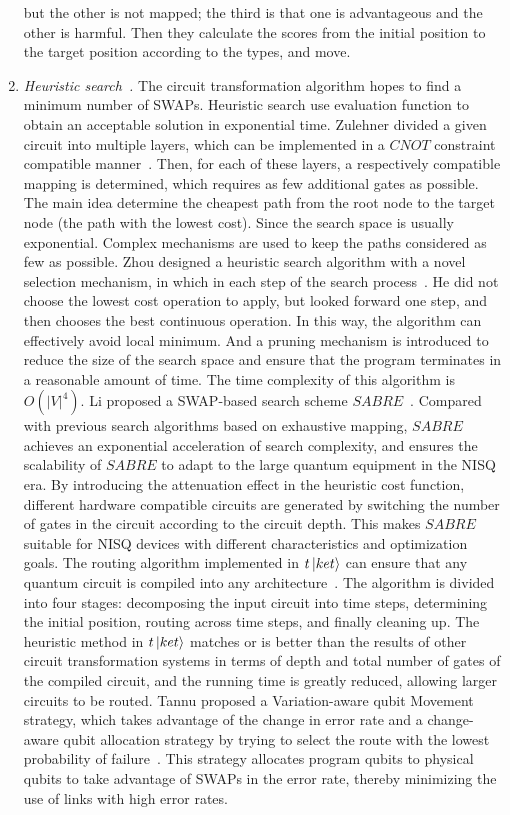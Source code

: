 \documentclass[runningheads]{llncs}
\begin{document}
\begin{enumerate}
   but the other is not mapped; 
   the third is that one is advantageous and the other is harmful.
   Then they calculate the scores from the initial position 
   to the target position according to the types, and move.
	\item \emph{Heuristic search~\cite{Zulehner2017,Cowtan2019,Li2018,Xiangzhen2020,2018QubitSiraichi}.}
	The circuit transformation algorithm hopes to find a minimum number of SWAPs. 
	Heuristic search use evaluation function to obtain an acceptable solution in exponential time.
	Zulehner divided a given circuit into multiple layers, 
	which can be implemented in a $CNOT$ 
	constraint compatible manner~\cite{Zulehner2017}. Then, for each of these layers, 
	a respectively compatible mapping is determined, 
	which requires as few additional gates as possible. 
	The main idea  determine the cheapest path from the root node to the target node 
	(the path with the lowest cost). Since the search space is usually exponential.
	Complex mechanisms are used to keep the paths considered as few as possible.
	Zhou designed a heuristic search algorithm with a novel selection 
	mechanism, in which in each step of the search process~\cite{Xiangzhen2020}.
	He did not choose the lowest cost operation to apply, 
	but looked forward one step, and then chooses the best continuous operation. 
	In this way, the algorithm can effectively avoid local minimum. 
	And a pruning mechanism is introduced 
	to reduce the size of the search space and ensure that the program 
	terminates in a reasonable amount of time. 
	The time complexity of this algorithm is $O(|V|^{4})$.
	Li proposed a SWAP-based search scheme $SABRE$~\cite{Li2018}. 
	Compared with previous search algorithms based on exhaustive mapping, 
	$SABRE$ achieves an exponential acceleration of search complexity,
	and ensures the scalability of $SABRE$ to adapt to the large 
	quantum equipment in the NISQ era.
	By introducing the attenuation effect in the heuristic cost function, 
	different hardware compatible circuits are generated by switching the number 
	of gates in the circuit according to the circuit depth.
	This makes $SABRE$ suitable for NISQ devices with different characteristics and optimization goals.
	The routing algorithm implemented in $t\left\vert{ket}\right\rangle$ can ensure 
	that any quantum circuit is compiled into any architecture~\cite{Cowtan2019}.
	The algorithm is divided into four stages: 
	decomposing the input circuit into time steps, 
	determining the initial position, 
	routing across time steps, and finally cleaning up.
	The heuristic method in $t\left\vert{ket}\right\rangle$ matches or is better than the results of 
	other circuit transformation systems in terms of depth and total number of gates of 
	the compiled circuit, and the running time is greatly reduced, allowing larger circuits to be routed.
	Tannu proposed a Variation-aware qubit Movement strategy, 
	which takes advantage of the change in error rate and a change-aware qubit allocation 
	strategy by trying to select the route with the lowest probability of failure~\cite{Tannu2019}. 
	This strategy allocates program qubits to physical qubits to take advantage 
	of SWAPs in the error rate, thereby minimizing the use of links with high error rates.
\end{enumerate} 
\end{document}
